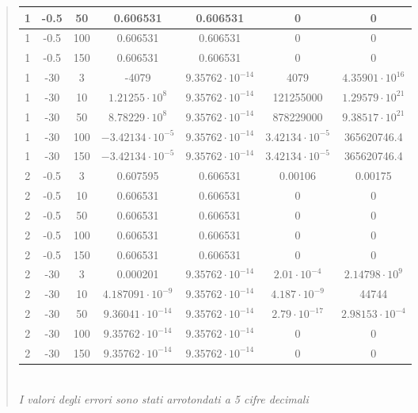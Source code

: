 \documentclass[10pt]{article}
\begin{document}
\begin{quote}
\begin{center}
\begin{tabular}{| c | c | c | c | c | c | c |}
            \hline
            1 & -0.5 & 50 & 0.606531 & 0.606531 & 0 & 0 \\
            \hline
            1 & -0.5 & 100 & 0.606531 & 0.606531 & 0 & 0 \\
            \hline
            1 & -0.5 & 150 & 0.606531 & 0.606531 & 0 & 0 \\
            \hline
            1 & -30 & 3 & -4079 & $9.35762\cdot10^{-14}$ & 4079 & $4.35901\cdot10^{16}$ \\
            \hline
            1 & -30 & 10 & $1.21255\cdot10^{8}$ & $9.35762\cdot10^{-14}$ & 121255000 & $1.29579\cdot10^{21}$ \\
            \hline
            1 & -30 & 50 & $8.78229\cdot10^{8}$ & $9.35762\cdot10^{-14}$ & 878229000 & $9.38517\cdot10^{21}$ \\
            \hline
            1 & -30 & 100 & $-3.42134\cdot10^{-5}$ & $9.35762\cdot10^{-14}$ & $3.42134\cdot10^{-5}$ & 365620746.4\\
            \hline
            1 & -30 & 150 & $-3.42134\cdot10^{-5}$ & $9.35762\cdot10^{-14}$ & $3.42134\cdot10^{-5}$ & 365620746.4 \\
            \hline
            2 & -0.5 & 3 & 0.607595 & 0.606531 & 0.00106 & 0.00175 \\
            \hline
            2 & -0.5 & 10 & 0.606531 & 0.606531 & 0 & 0 \\
            \hline
            2 & -0.5 & 50 & 0.606531 & 0.606531 & 0 & 0 \\
            \hline
            2 & -0.5 & 100 & 0.606531 & 0.606531 & 0 & 0 \\
            \hline
            2 & -0.5 & 150 & 0.606531 & 0.606531 & 0 & 0 \\
            \hline
            2 & -30 & 3 & 0.000201 & $9.35762\cdot 10^{-14}$ & $2.01\cdot10^{-4}$ & $2.14798\cdot 10^{9}$ \\
            \hline
            2 & -30 & 10 & $4.187091\cdot 10^{-9}$ & $9.35762\cdot 10^{-14}$ & $4.187\cdot10^{-9}$ & 44744 \\
            \hline
            2 & -30 & 50 & $9.36041\cdot 10^{-14}$ & $9.35762\cdot 10^{-14}$ & $2.79\cdot 10^{-17}$ & $2.98153\cdot 10^{-4}$ \\
            \hline
            2 & -30 & 100 & $9.35762\cdot 10^{-14}$ & $9.35762\cdot 10^{-14}$ & 0 & 0 \\
            \hline
            2 & -30 & 150 & $9.35762\cdot 10^{-14}$ & $9.35762\cdot 10^{-14}$ & 0 & 0 \\
            \hline
        \end{tabular}
        \vspace{0.5em}\\\textit{I valori degli errori sono stati arrotondati a 5 cifre decimali}
    \end{center}

\end{quote}
\end{document}
